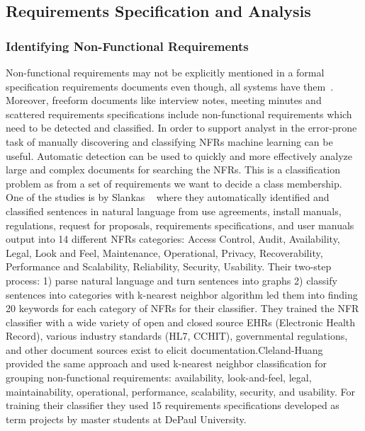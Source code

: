 \subsection{Requirements Specification and Analysis}

\subsubsection{Identifying Non-Functional Requirements}

Non-functional requirements may not be explicitly mentioned in a formal
specification requirements documents even though, all systems have
them~\cite{Slankas:2013}. Moreover, freeform documents like interview notes,
meeting minutes and scattered requirements specifications include non-functional
requirements which need to be detected and classified. In order to support
analyst in the error-prone task of manually discovering and classifying NFRs
machine learning can be useful. Automatic detection can be used to quickly and
more effectively analyze large and complex documents for searching the
NFRs\cite{Cleland-Huang2007}. This is a classification problem as from a set of
requirements we want to decide a class membership. \\

One of the studies is by Slankas \etal~\cite{Slankas:2013} where they
automatically identified and classified sentences in natural language from use
agreements, install manuals, regulations, request for proposals, requirements
specifications, and user manuals output into 14 different NFRs categories:
Access Control, Audit, Availability, Legal, Look and Feel, Maintenance, Operational, Privacy, Recoverability,
Performance and Scalability, Reliability, Security, Usability.
Their two-step process:
1) parse natural language and turn sentences into graphs 2) classify sentences into categories with k-nearest neighbor algorithm
led them into finding 20 keywords for each category of NFRs for their
classifier. They trained the NFR classifier with a wide variety of open and
closed source EHRs (Electronic Health Record), various industry standards (HL7,
CCHIT), governmental regulations, and other document sources exist to elicit
documentation.\newline Cleland-Huang \etal~\cite{Cleland-Huang2007} provided the
same approach and used k-nearest neighbor classification for grouping
non-functional requirements: availability, look-and-feel, legal,
maintainability, operational, performance, scalability, security, and usability.
For training their classifier they used 15 requirements specifications developed
as term projects by master students at DePaul University.

